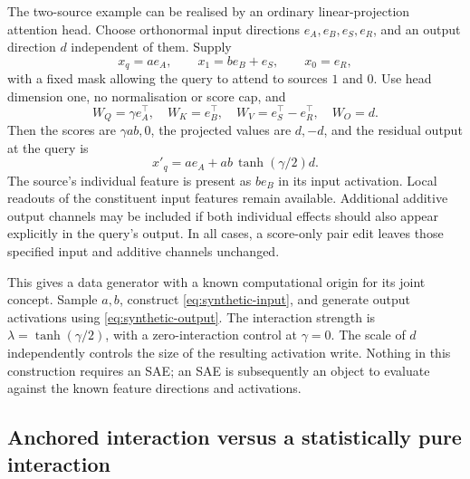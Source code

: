 \documentclass[11pt]{article}
\theoremstyle{plain}
\theoremstyle{definition}
\theoremstyle{remark}
\begin{document}
The two-source example can be realised by an ordinary linear-projection attention head. Choose orthonormal input directions $e_A,e_B,e_S,e_R$, and an output direction $d$ independent of them. Supply
\begin{equation}
 x_q=a e_A,\qquad x_1=b e_B+e_S,\qquad x_0=e_R,
\label{eq:synthetic-input}
\end{equation}
with a fixed mask allowing the query to attend to sources $1$ and $0$. Use head dimension one, no normalisation or score cap, and
\begin{equation}
 W_Q=\gamma e_A^\top,\quad W_K=e_B^\top,
 \quad W_V=e_S^\top-e_R^\top,\quad W_O=d.
\label{eq:synthetic-weights}
\end{equation}
Then the scores are $\gamma ab,0$, the projected values are $d,-d$, and the residual output at the query is
\begin{equation}
 x'_q=a e_A+ab\,\tanh(\gamma/2)d.
\label{eq:synthetic-output}
\end{equation}
The source's individual feature is present as $b e_B$ in its input activation. Local readouts of the constituent input features remain available. Additional additive output channels may be included if both individual effects should also appear explicitly in the query's output. In all cases, a score-only pair edit leaves those specified input and additive channels unchanged.

This gives a data generator with a known computational origin for its joint concept. Sample $a,b$, construct \cref{eq:synthetic-input}, and generate output activations using \cref{eq:synthetic-output}. The interaction strength is $\lambda=\tanh(\gamma/2)$, with a zero-interaction control at $\gamma=0$. The scale of $d$ independently controls the size of the resulting activation write. Nothing in this construction requires an SAE; an SAE is subsequently an object to evaluate against the known feature directions and activations.

\subsection{Anchored interaction versus a statistically pure interaction}
\end{document}
